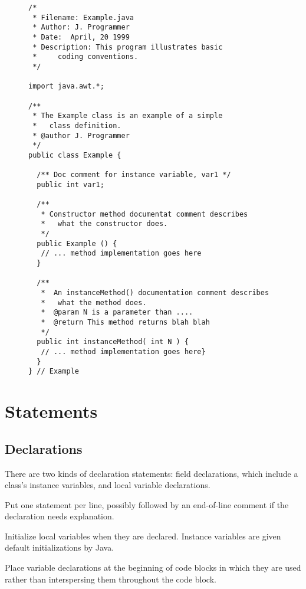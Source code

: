 \begin{figure}[tbhp]
\jjjprogstart
\begin{jjjlisting}
\begin{lstlisting}
/*
 * Filename: Example.java
 * Author: J. Programmer
 * Date:  April, 20 1999
 * Description: This program illustrates basic 
 *     coding conventions.
 */

import java.awt.*;

/**
 * The Example class is an example of a simple 
 *   class definition.
 * @author J. Programmer
 */
public class Example {

  /** Doc comment for instance variable, var1 */
  public int var1;

  /**
   * Constructor method documentat comment describes
   *   what the constructor does.
   */
  public Example () {
   // ... method implementation goes here
  }

  /**
   *  An instanceMethod() documentation comment describes
   *   what the method does.
   *  @param N is a parameter than ....
   *  @return This method returns blah blah
   */
  public int instanceMethod( int N ) {
   // ... method implementation goes here}
  }
} // Example
\end{lstlisting}
\end{jjjlisting}
\end{figure}


\section*{Statements}
\subsection*{Declarations}
\noindent There are two kinds of declaration statements: field declarations,
which include a class's instance variables, and local variable
declarations.

\begin{BL}
\item  Put one statement per line, possibly followed by an
end-of-line comment if the declaration needs explanation.

\item  Initialize local variables when they are declared.  Instance
variables are given default initializations by Java.

\item  Place variable declarations at the beginning of code blocks in which
they are used rather than interspersing them throughout the code
block.
\end{BL}




